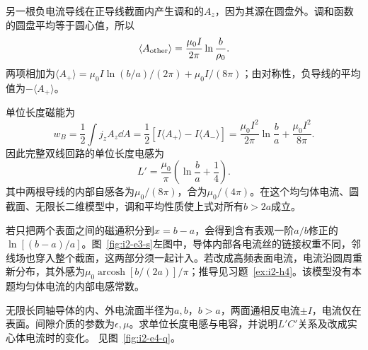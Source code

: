 \begin{solution}
另一根负电流导线在正导线截面内产生调和的$A_z$，因为其源在圆盘外。调和函数的圆盘平均等于圆心值，所以
\[\langle A_{\rm other}\rangle=\frac{\mu_0I}{2\pi}\ln\frac b{\rho_0}.
\]
两项相加为$\langle A_+\rangle=\mu_0I\ln(b/a)/(2\pi)+\mu_0I/(8\pi)$；由对称性，负导线的平均值为$-\langle A_+\rangle$。

单位长度磁能为
\[w_B=\frac12\int j_zA_z\dd A
=\frac12[I\langle A_+\rangle-I\langle A_-\rangle]
=\frac{\mu_0I^2}{2\pi}\ln\frac ba+\frac{\mu_0I^2}{8\pi}.
\]
因此完整双线回路的单位长度电感为
\[\boxed{L'=\frac{\mu_0}{\pi}\left(\ln\frac ba+\frac14\right)}.
\]
其中两根导线的内部自感各为$\mu_0/(8\pi)$，合为$\mu_0/(4\pi)$。在这个均匀体电流、圆截面、无限长二维模型中，调和平均性质使上式对所有$b>2a$成立。

若只把两个表面之间的磁通积分到$x=b-a$，会得到含有表观一阶$a/b$修正的$\ln[(b-a)/a]$。图~\ref{fig:i2-e3-s}左图中，导体内部各电流丝的链接权重不同，邻线场也穿入整个截面，这两部分须一起计入。若改成高频表面电流，电流沿圆周重新分布，其外感为$\mu_0\operatorname{arcosh}[b/(2a)]/\pi$；推导见习题~\ref{ex:i2-h4}。该模型没有本题均匀体电流的内部电感常数。
\end{solution}

\begin{example}\label{ex:i2-e4}
无限长同轴导体的内、外电流面半径为$a,b$，$b>a$，两面通相反电流$\pm I$，电流仅在表面。间隙介质的参数为$\epsilon,\mu$。求单位长度电感与电容，并说明$L'C'$关系及改成实心体电流时的变化。 见图~\ref{fig:i2-e4-q}。
\end{example}

